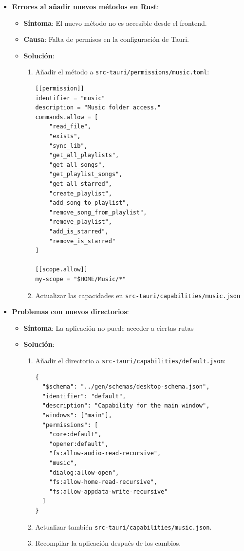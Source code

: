 \documentclass[11pt, a4paper]{article}
\begin{document}
    \begin{itemize}
        \item \textbf{Errores al añadir nuevos métodos en Rust}:
        \begin{itemize}
          \item \textbf{Síntoma}: El nuevo método no es accesible desde el frontend.
          \item \textbf{Causa}: Falta de permisos en la configuración de Tauri.
          \item \textbf{Solución}:
            \begin{enumerate}
              \item Añadir el método a \texttt{src-tauri/permissions/music.toml}:
                \begin{lstlisting}[caption={Solución permisos 1}]
[[permission]]
identifier = "music"
description = "Music folder access."
commands.allow = [
    "read_file",
    "exists",
    "sync_lib",
    "get_all_playlists",
    "get_all_songs",
    "get_playlist_songs",
    "get_all_starred",
    "create_playlist",
    "add_song_to_playlist",
    "remove_song_from_playlist",
    "remove_playlist",
    "add_is_starred",
    "remove_is_starred"
]

[[scope.allow]]
my-scope = "$HOME/Music/*"
                \end{lstlisting}
              \item Actualizar las capacidades en \texttt{src-tauri/capabilities/music.json}
            \end{enumerate}
        \end{itemize} \newpage
        
        \item \textbf{Problemas con nuevos directorios}:
        \begin{itemize}
          \item \textbf{Síntoma}: La aplicación no puede acceder a ciertas rutas
          \item \textbf{Solución}:
            \begin{enumerate}
              \item Añadir el directorio a \texttt{src-tauri/capabilities/default.json}:
                \begin{lstlisting}[caption={Solución permisos 2}]
{
  "$schema": "../gen/schemas/desktop-schema.json",
  "identifier": "default",
  "description": "Capability for the main window",
  "windows": ["main"],
  "permissions": [
    "core:default",
    "opener:default",
    "fs:allow-audio-read-recursive",
    "music",
    "dialog:allow-open",
    "fs:allow-home-read-recursive",
    "fs:allow-appdata-write-recursive"
  ]
}
                \end{lstlisting}
              \item Actualizar también \texttt{src-tauri/capabilities/music.json}.
              \item Recompilar la aplicación después de los cambios.
            \end{enumerate}
        \end{itemize}
        

\end{itemize}
\end{document}
